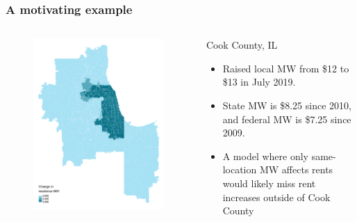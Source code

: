 \documentclass[aspectratio=169, t]{beamer}
\begin{document}
\begin{frame}
    \frametitle{A motivating example}
    \begin{columns}
        \begin{column}{0.44\textwidth}
            \vspace{-8mm}
            \begin{figure}
                \centering
                \includegraphics[scale = 0.39]{maps_events/output/chicago_2019-6_statutory_mw.png}
            \end{figure}   
        \end{column}
        \begin{column}{0.56\textwidth}
            Cook County, IL
            \begin{itemize}
                \item Raised local MW from \$12 to \$13 in July 2019. 
                \item State MW is \$8.25 since 2010, and federal MW is \$7.25 since 2009.
                \vspace{2mm}
                \pause
                \item A model where only same-location MW affects rents 
                would likely miss rent increases outside of Cook County
            \end{itemize}
        \end{column}
    \end{columns}
\end{frame}
\end{document}
